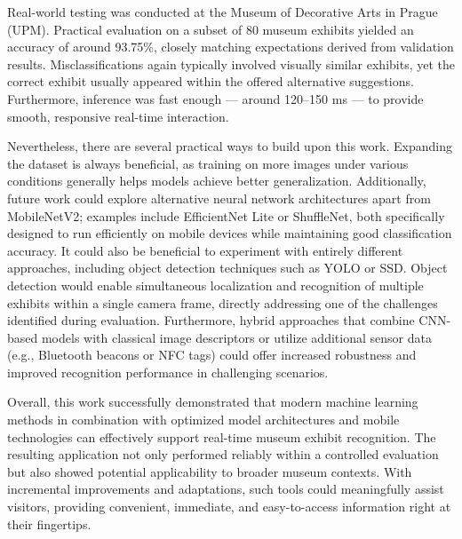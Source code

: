 Real-world testing was conducted at the Museum of Decorative Arts in Prague (UPM). Practical evaluation on a subset of 80 museum exhibits yielded an accuracy of around 93.75\%, closely matching expectations derived from validation results. Misclassifications again typically involved visually similar exhibits, yet the correct exhibit usually appeared within the offered alternative suggestions. Furthermore, inference was fast enough --- around 120--150 ms --- to provide smooth, responsive real-time interaction.

Nevertheless, there are several practical ways to build upon this work. Expanding the dataset is always beneficial, as training on more images under various conditions generally helps models achieve better generalization. Additionally, future work could explore alternative neural network architectures apart from MobileNetV2; examples include EfficientNet Lite or ShuffleNet, both specifically designed to run efficiently on mobile devices while maintaining good classification accuracy. It could also be beneficial to experiment with entirely different approaches, including object detection techniques such as YOLO or SSD. Object detection would enable simultaneous localization and recognition of multiple exhibits within a single camera frame, directly addressing one of the challenges identified during evaluation. Furthermore, hybrid approaches that combine CNN-based models with classical image descriptors or utilize additional sensor data (e.g., Bluetooth beacons or NFC tags) could offer increased robustness and improved recognition performance in challenging scenarios.

Overall, this work successfully demonstrated that modern machine learning methods in combination with optimized model architectures and mobile technologies can effectively support real-time museum exhibit recognition. The resulting application not only performed reliably within a controlled evaluation but also showed potential applicability to broader museum contexts. With incremental improvements and adaptations, such tools could meaningfully assist visitors, providing convenient, immediate, and easy-to-access information right at their fingertips.
